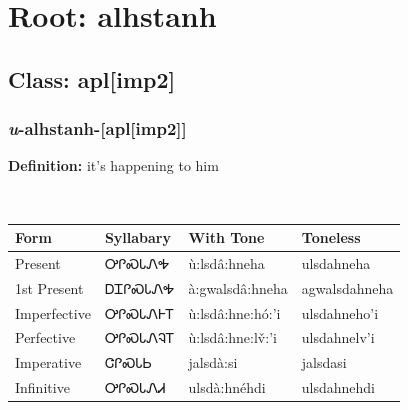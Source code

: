 \needspace{4in}
\section*{Root: alhstanh}
\nopagebreak
{}
\needspace{3in}
\subsection*{Class: apl[imp2]}
\nopagebreak
\needspace{2in}
\subsubsection*{\textit{u}{-}\textbf{alhstanh}{-}[apl[imp2]]}
\nopagebreak
\textbf{Definition: } it{\textquoteright}s happening to him
\\[0.5em]
\begin{tabularx}{\textwidth}{l X X X}%
\toprule%
\textbf{Form}&\textbf{Syllabary}&\textbf{With Tone}&\textbf{Toneless}\\%
\midrule%
Present&ᎤᎵᏍᏓᏁᎭ&ù:lsdâ:hneha&ulsdahneha\\%
1st Present&ᎠᏆᎵᏍᏓᏁᎭ&à:gwalsdâ:hneha&agwalsdahneha\\%
Imperfective&ᎤᎵᏍᏓᏁᎰᎢ&ù:lsdâ:hne:hó:’i&ulsdahneho’i\\%
Perfective&ᎤᎵᏍᏓᏁᎸᎢ&ù:lsdâ:hne:lv̌:’i&ulsdahnelv’i\\%
Imperative&ᏣᎵᏍᏓᏏ&jalsdà:si&jalsdasi\\%
Infinitive&ᎤᎵᏍᏓᏁᏗ&ulsdà:hnéhdi&ulsdahnehdi\\%
\bottomrule%
\end{tabularx}
\\[1em]